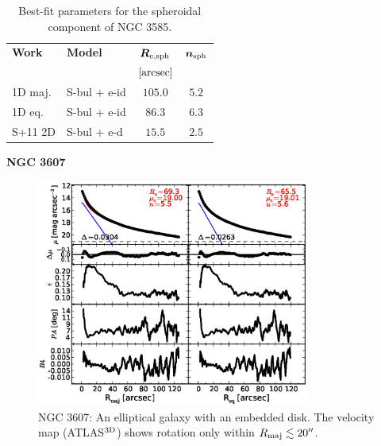 \documentclass[preprint2]{emulateapj}
\newcommand{\fitfigurewidth}{0.8\textwidth}
\begin{document}
  \begin{table}[h]
  \small
  \caption{Best-fit parameters for the spheroidal component of NGC 3585.}
  \begin{center}
  \begin{tabular}{llcc}
  \hline
  {\bf Work} & {\bf Model}   & $\bm R_{\rm e,sph}$    & $\bm n_{\rm sph}$ \\
    &  &  $[\rm arcsec]$ & \\
  \hline
  1D maj. & S-bul + e-id & $105.0$  &  $5.2$ \\
  1D eq.  & S-bul + e-id & $86.3$  &  $6.3$ \\
  \hline
  S+11 2D         & S-bul + e-d      & $15.5$   &  $2.5$ \\
  \hline
  \end{tabular}
  \end{center}
  \label{tab:n3585}
  \end{table}


  \clearpage\newpage\noindent

  {\bf NGC 3607 \\}

  \begin{figure}[h]
  \begin{center}
  \includegraphics[width=\fitfigurewidth]{images/n3607_1Dfit.eps}
  \caption{NGC 3607: 
  An elliptical galaxy with an embedded disk. 
  The velocity map (ATLAS$^{\rm 3D}$) shows rotation only within $R_{\rm maj} \lesssim 20''$. 
   }
  \end{center}
  \end{figure}
  
\end{document}
